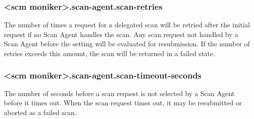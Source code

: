\subsubsection{<scm moniker>.scan-agent.scan-retries}\label{sec:scan-agent-scan-retries}
The number of times a request for a delegated scan will be retried after the initial request if no Scan Agent handles the scan.
Any scan request not handled by a Scan Agent before the  setting 
will be evaluated for resubmission.  If the number of retries exceeds this amount, the scan will be returned in a failed state.

\subsubsection{<scm moniker>.scan-agent.scan-timeout-seconds}\label{sec:scan-agent-scan-timeout-seconds}
The number of seconds before a scan request is not selected by a Scan Agent before it times out.  When the scan
request times out, it may be resubmitted or aborted as a failed scan.
